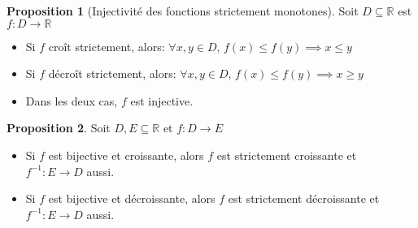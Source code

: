 \documentclass[10pt,a4paper]{article}
\theoremstyle{definition}
\newtheorem{proposition}{Proposition}[section]
\begin{document}
\begin{proposition}[Injectivité des fonctions strictement monotones]
Soit $D \subseteq \mathbb{R}$ est $f: D \to \mathbb{R}$
\begin{itemize}
\item Si $f$ croît strictement, alors: $\forall x, y \in D$, $f(x) \leq f(y) \implies x \leq y$
\item Si $f$ décroît strictement, alors: $\forall x, y \in D$, $f(x) \leq f(y) \implies x \geq y$
\item Dans les deux cas, $f$ est injective.
\end{itemize}
\end{proposition}
\begin{proposition}
Soit $D, E \subseteq \mathbb{R}$ et $f: D \to E$
\begin{itemize}
\item Si $f$ est bijective et croissante, alors $f$ est strictement croissante et $f^{-1}: E \to D$ aussi.
\item Si $f$ est bijective et décroissante, alors $f$ est strictement décroissante et $f^{-1} : E \to D$ aussi.
\end{itemize}
\end{proposition}

\pagebreak
\end{document}
